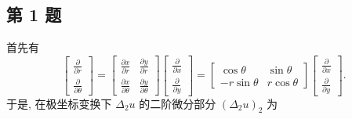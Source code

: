 \documentclass[\ROOT/main.tex]{subfiles}
\begin{document}
\subsection{第 1 题}
首先有
\[
    \begin{bmatrix}
        \frac{\partial}{\partial r} \\
        \frac{\partial}{\partial \theta}
    \end{bmatrix}
    =
    \begin{bmatrix}
        \frac{\partial x}{\partial r} & \frac{\partial y}{\partial r} \\
        \frac{\partial x}{\partial \theta} & \frac{\partial y}{\partial \theta}
    \end{bmatrix}
    \begin{bmatrix}
        \frac{\partial}{\partial x} \\
        \frac{\partial}{\partial y}
    \end{bmatrix}
    =
    \begin{bmatrix}
        \cos \theta & \sin \theta \\
        -r \sin \theta & r \cos \theta
    \end{bmatrix}
    \begin{bmatrix}
        \frac{\partial}{\partial x} \\
        \frac{\partial}{\partial y}
    \end{bmatrix}
    .
\]
于是, 在极坐标变换下 $\Delta_2 u$ 的二阶微分部分 $\left( \Delta_2 u \right)_2$ 为
\end{document}

